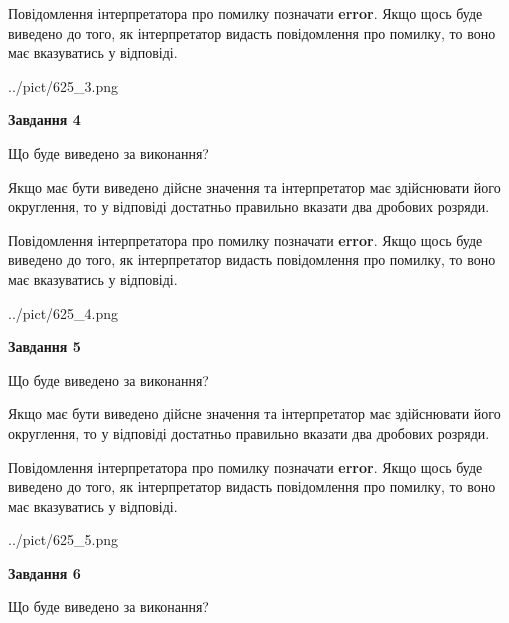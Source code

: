 \documentclass[12pt, ukrainian]{article}
\begin{document}
{\begin {Large}
Повідомлення інтерпретатора про помилку позначати \textbf{error}.
Якщо щось буде виведено до того, як інтерпретатор видасть повідомлення про помилку, 
то воно має вказуватись у відповіді. \par

\begin{center}
	{../pict/625_3.png}
\end{center}
\newpage

{\begin {center}\textbf{Завдання 4}\end {center}}\par
Що буде виведено за виконання? \par

Якщо має бути виведено дійсне значення та інтерпретатор має здійснювати його округлення, 
то у відповіді достатньо правильно вказати два дробових розряди.

Повідомлення інтерпретатора про помилку позначати \textbf{error}.
Якщо щось буде виведено до того, як інтерпретатор видасть повідомлення про помилку, 
то воно має вказуватись у відповіді. \par

\begin{center}
	{../pict/625_4.png}
\end{center}
\newpage

{\begin {center}\textbf{Завдання 5}\end {center}}\par
Що буде виведено за виконання? \par

Якщо має бути виведено дійсне значення та інтерпретатор має здійснювати його округлення, 
то у відповіді достатньо правильно вказати два дробових розряди.

Повідомлення інтерпретатора про помилку позначати \textbf{error}.
Якщо щось буде виведено до того, як інтерпретатор видасть повідомлення про помилку, 
то воно має вказуватись у відповіді. \par

\begin{center}
	{../pict/625_5.png}
\end{center}
\newpage

{\begin {center}\textbf{Завдання 6}\end {center}}\par
Що буде виведено за виконання? \par


\end{Large}}
\end{document}
